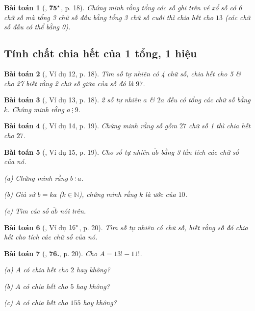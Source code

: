 \documentclass{article}
\numberwithin{equation}{section}
\newtheorem{baitoan}{Bài toán}[section]
\begin{document}
\begin{baitoan}[\cite{Binh_Toan_6_tap_1}, $\bf 75^\star$, p. 18]
	Chứng minh rằng tổng các số ghi trên vé xổ số có 6 chữ số mà tổng 3 chữ số đầu bằng tổng 3 chữ số cuối thì chia hết cho $13$ (các chữ số đầu có thể bằng 0).
\end{baitoan}

\subsection{Tính chất chia hết của 1 tổng, 1 hiệu}
\begin{baitoan}[\cite{Binh_Toan_6_tap_1}, Ví dụ 12, p. 18]
	Tìm số tự nhiên có 4 chữ số, chia hết cho 5 \& cho 27 biết rằng 2 chữ số giữa của số đó là $97$.
\end{baitoan}

\begin{baitoan}[\cite{Binh_Toan_6_tap_1}, Ví dụ 13, p. 18]
	2 số tự nhiên $a$ \& $2a$ đều có tổng các chữ số bằng $k$. Chứng minh rằng $a\ \vdots\ 9$.
\end{baitoan}

\begin{baitoan}[\cite{Binh_Toan_6_tap_1}, Ví dụ 14, p. 19]
	Chứng minh rằng số gồm $27$ chữ số 1 thì chia hết cho $27$.
\end{baitoan}

\begin{baitoan}[\cite{Binh_Toan_6_tap_1}, Ví dụ 15, p. 19]
	Cho số tự nhiên $\overline{ab}$ bằng 3 lần tích các chữ số của nó.
	\begin{enumerate*}
		\item[(a)] Chứng minh rằng $b\ \vdots\ a$.
		\item[(b)] Giả sử $b = ka$ ($k\in\mathbb{N}$), chứng minh rằng $k$ là ước của $10$.
		\item[(c)] Tìm các số $\overline{ab}$ nói trên.
	\end{enumerate*}
\end{baitoan}

\begin{baitoan}[\cite{Binh_Toan_6_tap_1}, Ví dụ $\rm 16^\star$, p. 20]
	Tìm số tự nhiên có chữ số, biết rằng số đó chia hết cho tích các chữ số của nó.
\end{baitoan}

\begin{baitoan}[\cite{Binh_Toan_6_tap_1}, \textbf{76.}, p. 20]
	Cho $A = 13! - 11!$.
	\begin{enumerate*}
		\item[(a)] $A$ có chia hết cho $2$ hay không?
		\item[(b)] $A$ có chia hết cho $5$ hay không?
		\item[(c)] $A$ có chia hết cho $155$ hay không?
	\end{enumerate*}
\end{baitoan}
\end{document}
